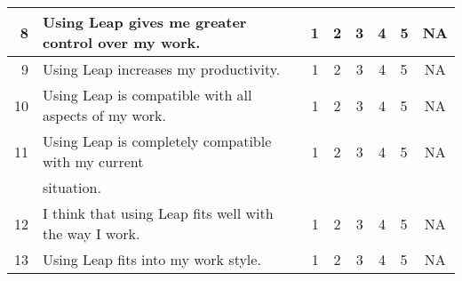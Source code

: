 \begin{table}[htbp]
\begin{tabular}{rlrccclc}
    8&Using Leap gives me greater control over my work.&1&2&3&4&5&NA\\ \hline
    9&Using Leap increases my productivity.&1&2&3&4&5&NA\\ \hline \hline
    10&Using Leap is compatible with all aspects of my work.&1&2&3&4&5&NA\\ \hline
    11&Using Leap is completely compatible with my current &1&2&3&4&5&NA\\
    &situation.\\ \hline
    12&I think that using Leap fits well with the way I work.&1&2&3&4&5&NA\\
    \hline
    13&Using Leap fits into my work style.&1&2&3&4&5&NA\\ \hline \hline



\end{tabular}
\end{table}
